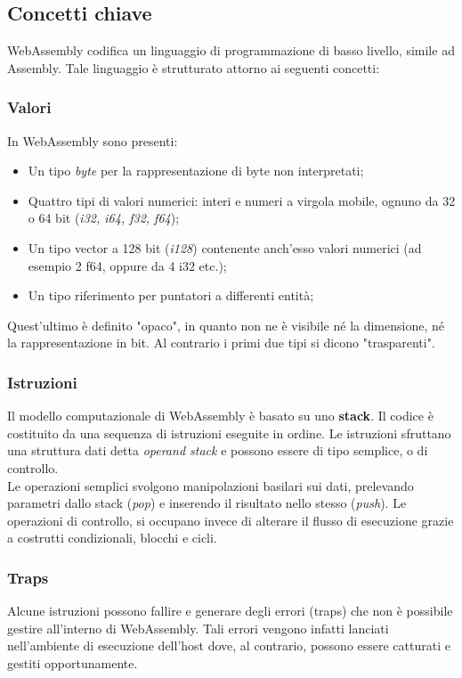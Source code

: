 \subsection{Concetti chiave}
WebAssembly codifica un linguaggio di programmazione di basso livello, simile ad Assembly. Tale linguaggio è strutturato attorno ai seguenti concetti:\cite*{wasmSpec}

\subsubsection{Valori}
In WebAssembly sono presenti:
\begin{itemize}
        \item Un tipo \emph{byte} per la rappresentazione di byte non interpretati;
        \item Quattro tipi di valori numerici: interi e numeri a virgola mobile, ognuno da 32 o 64 bit (\emph{i32, i64, f32, f64});
        \item Un tipo vector a 128 bit (\emph{i128}) contenente anch'esso valori numerici (ad esempio 2 f64, oppure da 4 i32 etc.);
        \item Un tipo riferimento per puntatori a differenti entità;
\end{itemize}
Quest'ultimo è definito "opaco", in quanto non ne è visibile né la dimensione, né la rappresentazione in bit. Al contrario i primi due tipi si dicono "trasparenti".
\newpage
\subsubsection{Istruzioni}
Il modello computazionale di WebAssembly è basato su uno \textbf{stack}. Il codice è costituito da una sequenza di istruzioni eseguite in ordine. Le istruzioni sfruttano una struttura dati detta \emph{operand stack} e possono essere di tipo semplice, o di controllo.
\\Le operazioni semplici svolgono manipolazioni basilari sui dati, prelevando parametri dallo stack (\emph{pop}) e inserendo il risultato nello stesso (\emph{push}). Le operazioni di controllo, si occupano invece di alterare il flusso di esecuzione grazie a costrutti condizionali, blocchi e cicli.
\subsubsection{Traps} 
Alcune istruzioni possono fallire e generare degli errori (traps) che non è possibile gestire all'interno di WebAssembly. Tali errori vengono infatti lanciati nell'ambiente di esecuzione dell'host dove, al contrario, possono essere catturati e gestiti opportunamente.
